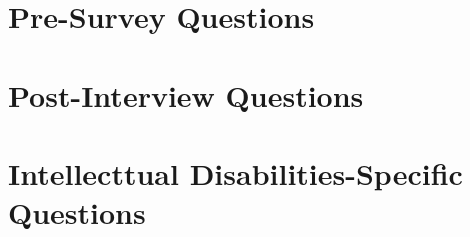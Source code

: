 \documentclass{l4proj}
\begin{document}
\begin{appendices}





\section{Pre-Survey Questions}


\section{Post-Interview Questions}


\section{Intellecttual Disabilities-Specific Questions}


\end{appendices}






\end{document}
